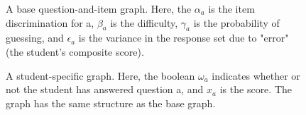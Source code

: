 \documentclass{article}
\begin{document}
 \begin{figure}
  \begin{center}
  \end{center}
    \caption{A base question-and-item graph. Here, the $\alpha_a$ is the item
    discrimination for a, $\beta_a$ is the difficulty, $\gamma_a$ is the
    probability of guessing, and $\epsilon_a$ is the variance in the response
    set due to "error" (the student's composite score).}
 \end{figure}


 \begin{figure}
  \begin{center}
    \caption{A student-specific graph. Here, the boolean $\omega_a$ indicates
    whether or not the student has answered question a, and $x_a$  is the
    score.  The graph has the same structure as the base graph.}
  \end{center}
 \end{figure}
\end{document}
